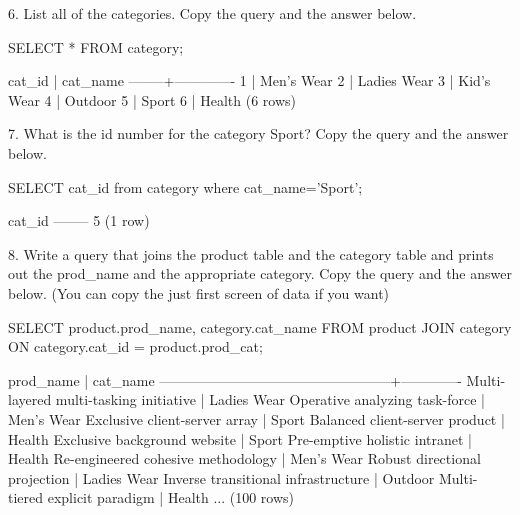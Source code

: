 6. List all of the categories. Copy the query and the answer below.
\begin{sql}
SELECT * FROM category;
\end{sql}
\begin{pseudo*}
 cat_id |  cat_name   
--------+-------------
      1 | Men's Wear
      2 | Ladies Wear
      3 | Kid's Wear
      4 | Outdoor
      5 | Sport
      6 | Health
(6 rows)
\end{pseudo*}

7. What is the id number for the category Sport? Copy the query and the answer below.
\begin{sql}
SELECT cat_id from category where cat_name='Sport';
\end{sql}
\begin{pseudo*}
 cat_id
--------
      5
(1 row)
\end{pseudo*}

8. Write a query that joins the product table and the category table and prints out the prod\_name and the appropriate category. Copy the query and the answer below. (You can copy the just first screen of data if you want)
\begin{sql}
SELECT product.prod_name, category.cat_name FROM product
JOIN category ON category.cat_id = product.prod_cat;
\end{sql}
\begin{pseudo*}
                    prod_name                     |  cat_name   
--------------------------------------------------+-------------
 Multi-layered multi-tasking initiative           | Ladies Wear
 Operative analyzing task-force                   | Men's Wear
 Exclusive client-server array                    | Sport
 Balanced client-server product                   | Health
 Exclusive background website                     | Sport
 Pre-emptive holistic intranet                    | Health
 Re-engineered cohesive methodology               | Men's Wear
 Robust directional projection                    | Ladies Wear
 Inverse transitional infrastructure              | Outdoor
 Multi-tiered explicit paradigm                   | Health
...
(100 rows)
\end{pseudo*}

